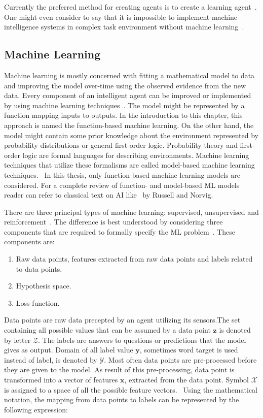 \documentclass[english, 12pt, a4paper, elec, utf8, online]{aaltothesis}
\begin{document}
Currently the preferred method for creating agents is to create a learning agent~\cite{AIMA}. One might even consider to say that it is impossible to implement machine intelligence systems in complex task environment without machine learning~\cite{Jung2018}.         

\subsection{Machine Learning}
Machine learning is mostly concerned with fitting a mathematical model to data and improving the model over-time using the observed evidence from the new data. Every component of an intelligent agent can be improved or implemented by using machine learning techniques~\cite{AIMA}. The model might be represented by a function mapping inputs to outputs. In the introduction to this chapter, this approach is named the function-based machine learning. On the other hand, the model might contain some prior knowledge about the environment represented by probability distributions or general first-order logic. Probability theory and first-order logic are formal languages for describing environments. Machine learning techniques that utilize these formalisms are called model-based machine learning techniques.~\cite{Jung2018, AIMA, Darwiche17} In this thesis, only function-based machine learning models are considered. For a complete review of function- and model-based ML models reader can refer to classical text on AI like~\cite{AIMA} by Russell and Norvig.

There are three principal types of machine learning: supervised, unsupervised and reinforcement~\cite{AIMA}. The difference is best understood by considering three components that are required to formally specify the ML problem~\cite{Jung2018}. These components are:
\begin{enumerate}
\item
Raw data points, features extracted from raw data points and labels related to data points.
\item 
Hypothesis space.
\item
Loss function.
\end{enumerate}

Data points are raw data precepted by an agent utilizing its sensors.The set containing all possible values that can be assumed by a data point $\mathbf{z}$ is denoted by letter $\mathcal{Z}$. The labels are answers to questions or predictions that the model gives as output. Domain of all label value $\mathbf{y}$, sometimes word target is used instead of label, is denoted by $\mathcal{Y}$. Most often data points are pre-processed before they are given to the model. As result of this pre-processing, data point is transformed into a vector of features $\mathbf{x}$, extracted from the data point. Symbol $\mathcal{X}$ is assigned to a space of all the possible feature vectors.~\cite{Jung2018} Using the mathematical notation, the mapping from data points to labels can be represented by the following expression:
\end{document}
